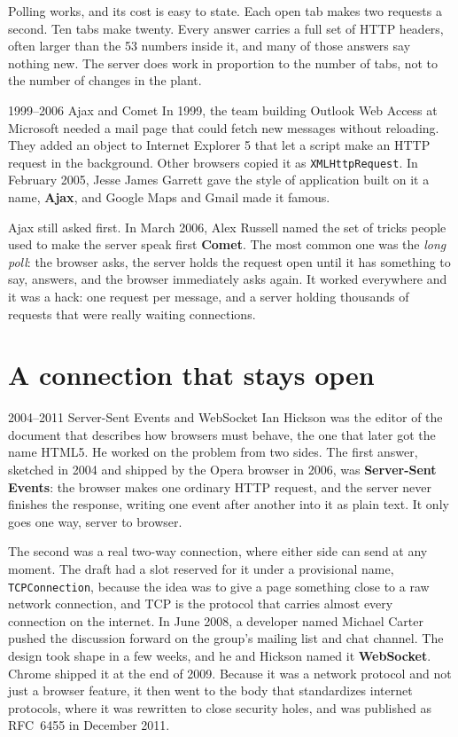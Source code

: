 Polling works, and its cost is easy to state. Each open tab makes two requests
a second. Ten tabs make twenty. Every answer carries a full set of HTTP headers,
often larger than the 53 numbers inside it, and many of those answers say
nothing new. The server does work in proportion to the number of tabs, not to
the number of changes in the plant.

\begin{history}{1999--2006 \textperiodcentered{} Ajax and Comet}
In 1999, the team building Outlook Web Access at Microsoft needed a mail page
that could fetch new messages without reloading. They added an object to
Internet Explorer 5 that let a script make an HTTP request in the background.
Other browsers copied it as \texttt{XMLHttpRequest}. In February 2005, Jesse
James Garrett gave the style of application built on it a name, \textbf{Ajax},
and Google Maps and Gmail made it famous.

Ajax still asked first. In March 2006, Alex Russell named the set of tricks
people used to make the server speak first \textbf{Comet}. The most common one
was the \emph{long poll}: the browser asks, the server holds the request open
until it has something to say, answers, and the browser immediately asks again.
It worked everywhere and it was a hack: one request per message, and a server
holding thousands of requests that were really waiting connections.
\end{history}

\section{A connection that stays open}

\begin{history}{2004--2011 \textperiodcentered{} Server-Sent Events and WebSocket}
Ian Hickson was the editor of the document that describes how browsers must
behave, the one that later got the name HTML5. He worked on the problem from
two sides. The first answer, sketched in 2004 and shipped by the Opera browser
in 2006, was \textbf{Server-Sent Events}: the browser makes one ordinary HTTP
request, and the server never finishes the response, writing one event after
another into it as plain text. It only goes one way, server to browser.

The second was a real two-way connection, where either side can send at any
moment. The draft had a slot reserved for it under a provisional name,
\texttt{TCPConnection}, because the idea was to give a page something close to
a raw network connection, and TCP is the protocol that carries almost every
connection on the internet. In June 2008, a developer named Michael Carter
pushed the discussion forward on the group's mailing list and chat channel. The
design took shape in a few weeks, and he and Hickson named it
\textbf{WebSocket}. Chrome shipped it at the end of 2009. Because it was a
network protocol and not just a browser feature, it then went to the body that
standardizes internet protocols, where it was rewritten to close security
holes, and was published as RFC~6455 in December 2011.
\end{history}

